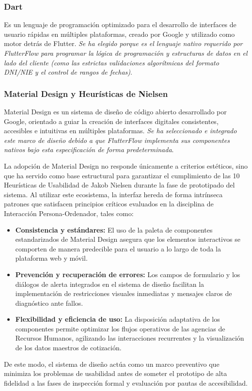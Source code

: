 \subsubsection{Dart}
Es un lenguaje de programación optimizado para el desarrollo de interfaces de usuario rápidas en múltiples plataformas, creado por Google y utilizado como motor detrás de Flutter. \textit{Se ha elegido porque es el lenguaje nativo requerido por FlutterFlow para programar la lógica de programación y estructuras de datos en el lado del cliente (como las estrictas validaciones algorítmicas del formato DNI/NIE y el control de rangos de fechas)}.


\subsubsection{Material Design y Heurísticas de Nielsen}
Material Design es un sistema de diseño de código abierto desarrollado por Google, orientado a guiar la creación de interfaces digitales consistentes, accesibles e intuitivas en múltiples plataformas. \textit{Se ha seleccionado e integrado este marco de diseño debido a que FlutterFlow implementa sus componentes nativos bajo esta especificación de forma predeterminada}. 

La adopción de Material Design no responde únicamente a criterios estéticos, sino que ha servido como base estructural para garantizar el cumplimiento de las 10 Heurísticas de Usabilidad de Jakob Nielsen durante la fase de prototipado del sistema. Al utilizar este ecosistema, la interfaz hereda de forma intrínseca patrones que satisfacen principios críticos evaluados en la disciplina de Interacción Persona-Ordenador, tales como:
\begin{itemize}
    \item \textbf{Consistencia y estándares:} El uso de la paleta de componentes estandarizados de Material Design asegura que los elementos interactivos se comporten de manera predecible para el usuario a lo largo de toda la plataforma web y móvil.
    \item \textbf{Prevención y recuperación de errores:} Los campos de formulario y los diálogos de alerta integrados en el sistema de diseño facilitan la implementación de restricciones visuales inmediatas y mensajes claros de diagnóstico ante fallos.
    \item \textbf{Flexibilidad y eficiencia de uso:} La disposición adaptativa de los componentes permite optimizar los flujos operativos de las agencias de Recursos Humanos, agilizando las interacciones recurrentes y la visualización de los datos maestros de cotización.
\end{itemize}
De este modo, el sistema de diseño actúa como un marco preventivo que minimiza los problemas de usabilidad antes de someter el prototipo de alta fidelidad a las fases de inspección formal y evaluación por pautas de accesibilidad.

